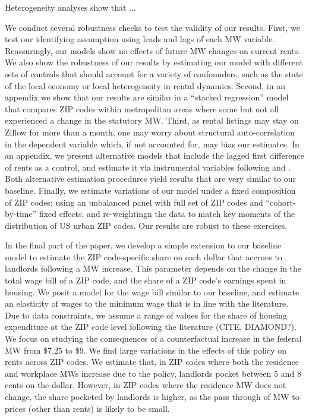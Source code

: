 Heterogeneity analyses show that ...


We conduct several robustness checks to test the validity of our results.
First, we test our identifying assumption using leads and lags of each MW variable.
Reassuringly, our models show no effects of future MW changes on current rents.
We also show the robustness of our results by estimating our model with different 
sets of controls that should account for a variety of confounders, such as the state
of the local economy or local heterogeneity in rental dynamics.
Second, in an appendix we show that our results are similar in a ``stacked regression'' 
model that compares ZIP codes within metropolitan areas where some but not all
experienced a change in the statutory MW.
Third, as rental listings may stay on Zillow for more than a month, one may worry 
about structural auto-correlation in the dependent variable which, if not accounted 
for, may bias our estimates.
In an appendix, we present alternative models that include the lagged first 
difference of rents as a control, and estimate it via instrumental variables
following \textcite{ArellanoBond1991} and \textcite{MeerWest2016}.
Both alternative estimation procedures yield results that are very similar to our 
baseline.
Finally, we estimate variations of our model under a fixed composition of ZIP codes;
using an unbalanced panel with full set of ZIP codes and ``cohort-by-time'' fixed 
effects; and re-weightingn the data to match key moments of the distribution of 
US urban ZIP codes.
Our results are robust to these exercises.


In the final part of the paper, we develop a simple extension to our baseline model
to estimate the ZIP code-specific share on each dollar that accrues to landlords
following a MW increase.
This parameter depends on the change in the total wage bill of a ZIP code, and the 
share of a ZIP code's earnings spent in housing.
We posit a model for the wage bill similar to our baseline, and estimate an elasticity
of wages to the minimum wage that is in line with the literature. %
Due to data constraints, we assume a range of values for the share of housing
expenditure at the ZIP code level following the literature (CITE, DIAMOND?).
We focus on studying the consequences of a counterfactual increase 
in the federal MW from \$7.25 to \$9.
We find large variations in the effects of this policy on rents across ZIP codes.
We estimate that, in ZIP codes where both the residence and workplace MWs increase
due to the policy, landlords pocket between 5 and 8 cents on the dollar.
However, in ZIP codes where the residence MW does not change, the share pocketed
by landlords is higher, as the pass through of MW to prices (other than rents)
is likely to be small.

